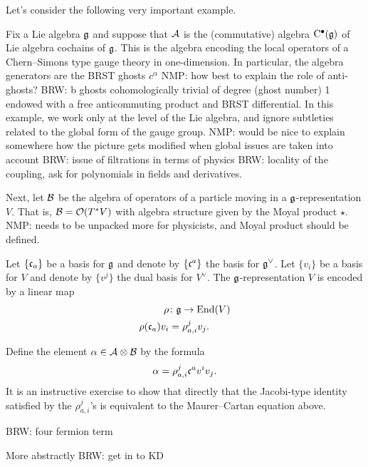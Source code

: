 \documentclass[11pt]{amsart}
\def\brian#1{{\textcolor{blue!65!red}{BRW: {#1}}}}
\def\natalie#1{{\textcolor{green!65!black}{NMP: {#1}}}}
\begin{document}
Let's consider the following very important example. 
\begin{eg}\label{eg:gauge}
Fix a Lie algebra $\mathfrak g$ and
suppose that $\mathcal A$ is the (commutative) algebra ${\rm C}^\bullet(\mathfrak g)$ of Lie algebra cochains of $\mathfrak g$. 
This is the algebra encoding the local operators of a Chern--Simons type gauge theory in one-dimension. In particular, the algebra generators are the BRST ghosts $c^{\alpha}$ \natalie{how best to explain the role of anti-ghosts?} \brian{b ghosts cohomologically trivial} of degree (ghost number) 1 endowed with a free anticommuting product and BRST differential. In this example, we work only at the level of the Lie algebra, and ignore subtleties related to the global form of the gauge group. \natalie{would be nice to explain somewhere how the picture gets modified when global issues are taken into account} 
\brian{issue of filtrations in terms of physics}
\brian{locality of the coupling, ask for polynomials in fields and derivatives.}

Next, let $\mathcal B$ be the algebra of operators of a particle moving in a $\mathfrak g$-representation $V$.
That is, $\mathcal B = \mathcal O(T^* V)$ with algebra structure given by the Moyal product $\star$. \natalie{needs to be unpacked more for physicists, and Moyal product should be defined.}

Let $\{\mathfrak c_a\}$ be a basis for $\mathfrak g$ and denote by $\{\mathfrak c^a\}$ the basis for $\mathfrak g^\vee$. 
Let $\{v_i\}$ be a basis for $V$ and denote by $\{v^j\}$ the dual basis for $V^\vee$.
The $\mathfrak g$-representation $V$ is encoded by a linear map 
\begin{align*}
\rho & \colon \mathfrak g \to {\rm End}(V) \\
\rho(\mathfrak c_a) v_i& = \rho_{a,i}^j v_j .
\end{align*}

Define the element $\alpha \in \mathcal A \otimes \mathcal B$ by the formula
\[
\alpha = \rho_{a,i}^j \mathfrak c^a v^i v_j .
\]
It is an instructive exercise to show that directly that the Jacobi-type identity satisfied by the $\rho_{a,i}^j$'s is equivalent to the Maurer--Cartan equation above. 
\end{eg}

\begin{eg} 
\brian{four fermion term}
\end{eg}

More abstractly \brian{get in to KD}

%
\end{document}
